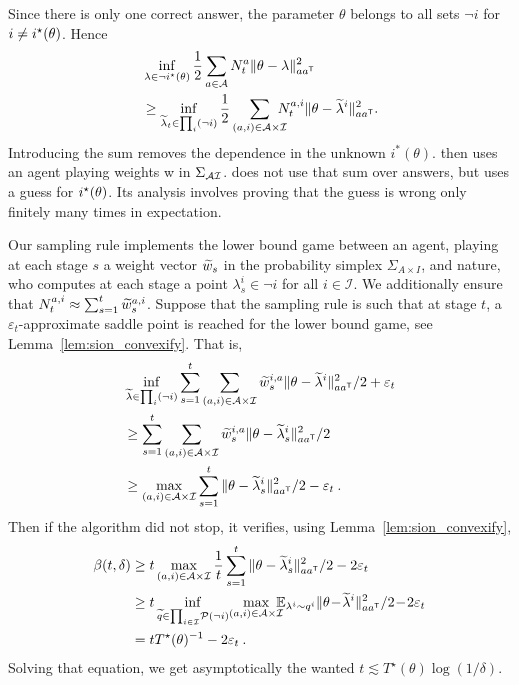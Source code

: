 Since there is only one correct answer, the parameter $\theta$ belongs to all sets $\neg i$ for $i\neq i^\star(\theta)$. Hence
\begin{align*}
&\inf_{\lambda\in \neg i^\star(\theta)}\frac{1}{2} \sum_{a\in \mathcal{A}} N_t^a \Vert \theta - \lambda \Vert^2_{a a^{\mathsf{\scriptscriptstyle T}}}
\\&\geq \inf_{\widetilde{\lambda}_t\in \prod_i (\neg i)}\frac{1}{2}\sum_{(a,i)\in \mathcal{A}\times\mathcal{I}}\!\!\!\!\! N_t^{a,i} \Vert \theta - \widetilde{\lambda}^i \Vert^2_{a a^{\mathsf{\scriptscriptstyle T}}}.
\end{align*} Introducing the sum removes the dependence in the unknown $i^*(\theta)$. \LGC then uses an agent playing weights w in $\Sigma_{\mathcal{A}\mathcal{I}}$. \LG does not use that sum over answers, but uses a guess for $i^\star(\theta)$. Its analysis involves proving that the guess is wrong only finitely many times in expectation.

Our sampling rule implements the lower bound game between an agent, playing at each stage $s$ a weight vector $\widetilde{w}_s$ in the probability simplex $\Sigma_{A\times I}$, and nature, who computes at each stage a point $\lambda_s^i \in \neg i$ for all $i\in \mathcal I$. We additionally ensure that $N_t^{a,i} \approx \sum_{s=1}^t \widetilde{w}_s^{a,i}$. Suppose that the sampling rule is such that at stage $t$, a $\varepsilon_t$-approximate saddle point is reached for the lower bound game, see Lemma~\ref{lem:sion_convexify}. That is,
\begin{align*}
&\inf_{\widetilde{\lambda} \in \prod_{i}(\neg i)} \sum_{s=1}^t \sum_{(a,i)\in \mathcal{A}\times\mathcal{I}} \widetilde{w}_s^{i,a} \Vert \theta - \widetilde{\lambda}^i \Vert^2_{a a^{\mathsf{\scriptscriptstyle T}}}/2 +\varepsilon_t
\\
&\ge \sum_{s=1}^t \sum_{(a,i)\in \mathcal{A}\times\mathcal{I}} \widetilde{w}_s^{i,a} \Vert \theta - \widetilde{\lambda}_s^i \Vert^2_{a a^{\mathsf{\scriptscriptstyle T}}}/2
\\
&\ge\max_{(a,i)\in \mathcal{A}\times\mathcal{I}} \sum_{s=1}^t \Vert \theta - \widetilde{\lambda}_s^i \Vert^2_{a a^{\mathsf{\scriptscriptstyle T}}}/2 - \varepsilon_t \: .
\end{align*}
Then if the algorithm did not stop, it verifies, using Lemma~\ref{lem:sion_convexify},
\begin{align*}
\beta(t,\delta)
&\ge t \max_{(a,i)\in \cA\times\cI} \frac{1}{t}\sum_{s=1}^t \Vert \theta - \tlambda_s^i \Vert^2_{a a^\top}/2 - 2\varepsilon_t
\\
&\ge t \inf_{\tq \in \mathcal \prod_{i\in \mathcal I}\cP(\neg i)} \! \max_{(a,i)\in \cA\times\cI} \!\!\!\! \mathbb{E}_{\lambda^i\sim q^i}\Vert \theta \! - \! \tlambda^i \Vert^2_{a a^\top}/2 \! - \! 2\varepsilon_t\\
&= t T^\star(\theta)^{-1} - 2 \varepsilon_t \: .
\end{align*}
Solving that equation, we get asymptotically the wanted $t\lesssim T^\star(\theta) \log(1/\delta)$.

